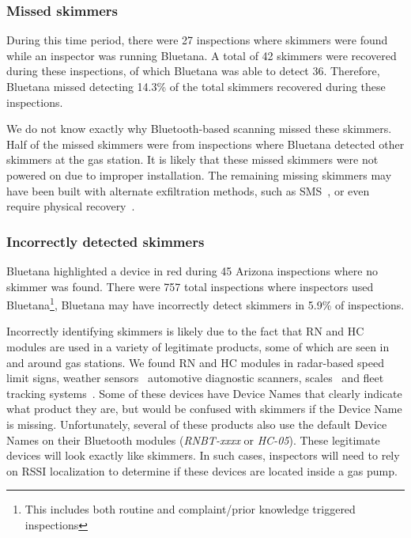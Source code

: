 \subsubsection*{Missed skimmers}
\label{sec:falsenegative}


During this time period, there were 27 inspections where
skimmers were found while an inspector was running Bluetana.
%
A total of 42 skimmers were
recovered during these inspections, of which Bluetana was able to detect 36.
%
Therefore, Bluetana missed detecting 14.3\% of the total skimmers recovered during these inspections.

We do not know exactly why Bluetooth-based scanning missed these skimmers.
%
Half of the missed skimmers were from inspections where Bluetana detected other
skimmers at the gas station.
%
It is likely that these missed skimmers were not powered on due to
improper installation.
%
The remaining missing skimmers may have been built with alternate
exfiltration methods, such as SMS~\cite{scaifeoakland}, or even require physical
recovery~\cite{skimreaper2018}.

%
	

\subsubsection*{Incorrectly detected skimmers}
\label{sec:falsepositive}

Bluetana highlighted a device in red during 45 Arizona inspections where no
skimmer was found.
%
There were 757 total inspections where inspectors used
Bluetana\footnote{This includes both routine and complaint/prior knowledge
triggered inspections},  Bluetana may have incorrectly detect skimmers in 5.9\%
of inspections.


Incorrectly identifying skimmers is likely due to the fact that  RN and HC
modules are used in a variety of legitimate products, some of which are seen in
and around gas stations.
%
We found RN and HC modules in radar-based speed limit signs, weather
sensors~\cite{rnbtweathersensor} automotive diagnostic scanners,
scales~\cite{rnbtscale} and fleet tracking systems~\cite{rnbteletrac}.
%
Some of these devices have Device Names that clearly indicate what product they
are, but would be confused with skimmers if the Device Name
is missing.
%
Unfortunately, several of these products also use the default Device Names on
their Bluetooth modules (\emph{RNBT-xxxx} or \emph{HC-05}).
%
These legitimate devices will look exactly like skimmers.
%
In such cases, inspectors will need to rely on RSSI localization to determine if these devices
are located inside a gas pump.

